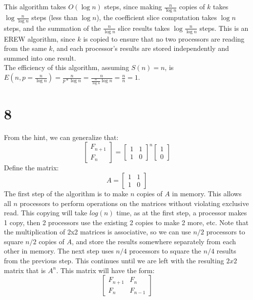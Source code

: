 \documentclass[letterpaper,notitlepage,twoside]{article}
\begin{document}
\\\\
This algorithm takes $O(\log n)$ steps, since making $\frac{n}{\log n}$ copies of $k$ takes $\log \frac{n}{\log n}$ steps (less than $\log n$), the coefficient slice computation takes $\log n$ steps, and the summation of the $\frac{n}{\log n}$ slice results takes $\log \frac{n}{\log n}$ steps. This is an EREW algorithm, since $k$ is copied to ensure that no two processors are reading from the same $k$, and each processor's results are stored independently and summed into one result.
\\
The efficiency of this algorithm, assuming $S(n) = n$, is $E(n, p = \frac{n}{\log n}) = \frac{n}{p * \log n} = \frac{n}{\frac{n}{\log n} \log n} = \frac{n}{n} = 1$.

\section*{8}
From the hint, we can generalize that:
\[
  \begin{bmatrix}
    F_{n+1} \\
    F_n 
  \end{bmatrix}
  =
   \begin{bmatrix}
    1&1 \\
    1&0 
  \end{bmatrix}^n
   \begin{bmatrix}
    1\\
    0 
  \end{bmatrix}
\]
Define the matrix:
\[ A=\begin{bmatrix}
    1&1 \\
    1&0 
  \end{bmatrix}
\]
The first step of the algorithm is to make $n$ copies of $A$ in memory. This allows all $n$ processors to perform operations on the matrices without violating exclusive read. This copying will take $log(n)$ time, as at the first step, a processor makes 1 copy, then 2 processors use the existing 2 copies to make 2 more, etc. Note that the multiplication of 2x2 matrices is associative, so we can use $n/2$ processors to square $n/2$ copies of $A$, and store the results somewhere separately from each other in memory. The next step uses $n/4$ processors to square the $n/4$ results from the previous step. This continues until we are left with the resulting $2x2$ matrix that is $A^n$. This matrix will have the form:
\[
  \begin{bmatrix}
    F_{n+1} & F_n \\
    F_n & F_{n-1} 
  \end{bmatrix}
\]
\end{document}
